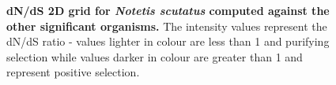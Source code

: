 \documentclass{article}
\begin{document}
\begin{figure}[H]
\centering
{}
\caption{\textbf{dN/dS 2D grid for \textit{Notetis scutatus} computed against the other significant organisms.} The intensity values represent the dN/dS ratio - values lighter in colour are less than 1 and purifying selection while values darker in colour are greater than 1 and represent positive selection.}
\label{sup_fig_29}
\end{figure}
\end{document}
